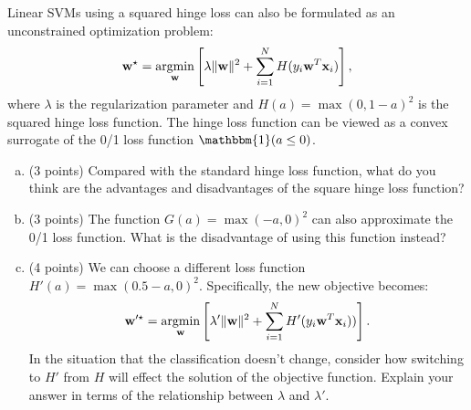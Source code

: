 \documentclass[11pt]{article}
\DeclareMathOperator*{\argmin}{argmin}
\newcommand{\vw}{{\bf w}}
\newcommand{\vxi}{{\bf x}_i}
\newcounter{QuestionCounter}
\newcounter{SubQuestionCounter}[QuestionCounter]
\newcommand{\newquestion}{\stepcounter{QuestionCounter}\setcounter{SubQuestionCounter}{1}\newpage}
\begin{document}
Linear SVMs using a squared hinge loss can also be formulated as an unconstrained optimization problem:
\begin{align}
\vw^{\star} = \argmin_{\vw} \left[ \lambda \lVert \vw \rVert^2 + \sum_{i=1}^N H(y_i \vw^T \vxi) \right],
\end{align}
where $\lambda$ is the regularization parameter and $H(a) = \max(0, 1-a)^2$ is the squared hinge loss function. The hinge loss function can be viewed as a convex surrogate of the 0/1 loss function $\mathbbm{1}(a \leq 0)$.
\begin{enumerate}[(a)]

\item (3 points) Compared with the standard hinge loss function, what do you think are the advantages and disadvantages of the square hinge loss function?

\begin{answertext}{8cm}{}
    
\end{answertext} 

\item (3 points) The function $G(a) = \max(-a,0)^2$ can also approximate the 0/1 loss function. What is the disadvantage of using this function instead?

\begin{answertext}{7cm}{}
    
\end{answertext} 

\item (4 points) We can choose a different loss function $H'(a) = \max(0.5-a,0)^2$. Specifically, the new objective becomes:
\begin{align}
\vw'^{\star} = \argmin_{\vw} \left[ \lambda' \lVert \vw \rVert^2 + \sum_{i=1}^N H'(y_i \vw^T \vxi)) \right].
\end{align}
 In the situation that the classification doesn't change, consider how switching to $H'$ from $H$ will effect the solution of the objective function. Explain your answer in terms of the relationship between $\lambda$ and $\lambda'$. 
\end{enumerate}

\begin{answertext}{8cm}{}
    
\end{answertext} 
\newquestion
\end{document}
